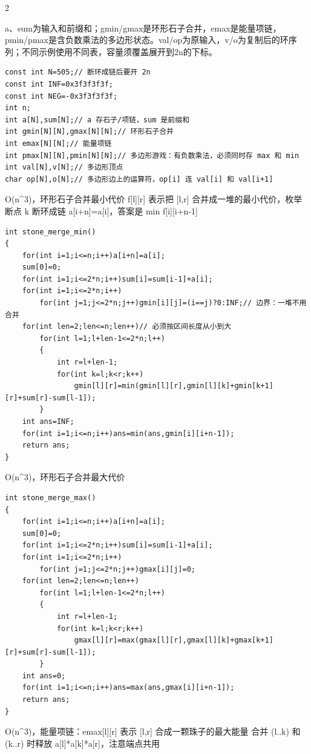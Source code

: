 \documentclass[UTF8,fontset=fandol,a4paper,twoside]{ctexart}
\newcommand{\note}[1]{{\fontsize{10}{12}\selectfont #1\par}}
\begin{document}
\begin{multicols}{2}
\note{a、sum为输入和前缀和；gmin/\allowbreak{}gmax是环形石子合并，emax是能量项链，pmin/\allowbreak{}pmax是含负数乘法的多边形状态。val/\allowbreak{}op为原输入，v/\allowbreak{}o为复制后的环序列；不同示例使用不同表，容量须覆盖展开到2n的下标。}
\begin{lstlisting}
const int N=505;// 断环成链后要开 2n
const int INF=0x3f3f3f3f;
const int NEG=-0x3f3f3f3f;
int n;
int a[N],sum[N];// a 存石子/项链，sum 是前缀和
int gmin[N][N],gmax[N][N];// 环形石子合并
int emax[N][N];// 能量项链
int pmax[N][N],pmin[N][N];// 多边形游戏：有负数乘法，必须同时存 max 和 min
int val[N],v[N];// 多边形顶点
char op[N],o[N];// 多边形边上的运算符，op[i] 连 val[i] 和 val[i+1]
\end{lstlisting}
\note{O(\allowbreak{}n\textasciicircum{}3)\allowbreak{}，环形石子合并最小代价 f[\allowbreak{}l]\allowbreak{}[\allowbreak{}r]\allowbreak{} 表示把 [\allowbreak{}l,\allowbreak{}r]\allowbreak{} 合并成一堆的最小代价，枚举断点 k 断环成链 a[\allowbreak{}i+\allowbreak{}n]\allowbreak{}=\allowbreak{}a[\allowbreak{}i]\allowbreak{}，答案是 min f[\allowbreak{}i]\allowbreak{}[\allowbreak{}i+\allowbreak{}n-\allowbreak{}1]\allowbreak{}}
\begin{lstlisting}
int stone_merge_min()
{
    for(int i=1;i<=n;i++)a[i+n]=a[i];
    sum[0]=0;
    for(int i=1;i<=2*n;i++)sum[i]=sum[i-1]+a[i];
    for(int i=1;i<=2*n;i++)
        for(int j=1;j<=2*n;j++)gmin[i][j]=(i==j)?0:INF;// 边界：一堆不用合并
    for(int len=2;len<=n;len++)// 必须按区间长度从小到大
        for(int l=1;l+len-1<=2*n;l++)
        {
            int r=l+len-1;
            for(int k=l;k<r;k++)
                gmin[l][r]=min(gmin[l][r],gmin[l][k]+gmin[k+1][r]+sum[r]-sum[l-1]);
        }
    int ans=INF;
    for(int i=1;i<=n;i++)ans=min(ans,gmin[i][i+n-1]);
    return ans;
}
\end{lstlisting}
\note{O(\allowbreak{}n\textasciicircum{}3)\allowbreak{}，环形石子合并最大代价}
\begin{lstlisting}
int stone_merge_max()
{
    for(int i=1;i<=n;i++)a[i+n]=a[i];
    sum[0]=0;
    for(int i=1;i<=2*n;i++)sum[i]=sum[i-1]+a[i];
    for(int i=1;i<=2*n;i++)
        for(int j=1;j<=2*n;j++)gmax[i][j]=0;
    for(int len=2;len<=n;len++)
        for(int l=1;l+len-1<=2*n;l++)
        {
            int r=l+len-1;
            for(int k=l;k<r;k++)
                gmax[l][r]=max(gmax[l][r],gmax[l][k]+gmax[k+1][r]+sum[r]-sum[l-1]);
        }
    int ans=0;
    for(int i=1;i<=n;i++)ans=max(ans,gmax[i][i+n-1]);
    return ans;
}
\end{lstlisting}
\note{O(\allowbreak{}n\textasciicircum{}3)\allowbreak{}，能量项链：emax[\allowbreak{}l]\allowbreak{}[\allowbreak{}r]\allowbreak{} 表示 [\allowbreak{}l,\allowbreak{}r]\allowbreak{} 合成一颗珠子的最大能量 合并 (\allowbreak{}l.\allowbreak{}.\allowbreak{}k)\allowbreak{} 和 (\allowbreak{}k.\allowbreak{}.\allowbreak{}r)\allowbreak{} 时释放 a[\allowbreak{}l]\allowbreak{}*a[\allowbreak{}k]\allowbreak{}*a[\allowbreak{}r]\allowbreak{}，注意端点共用}

\end{multicols}
\end{document}
